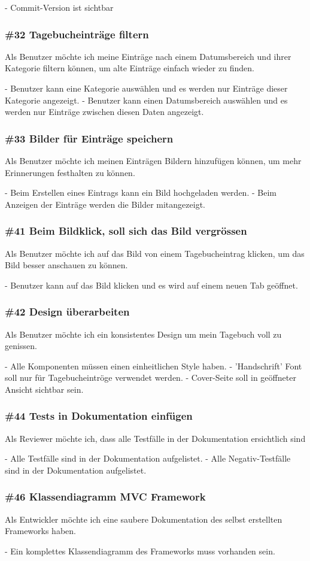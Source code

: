 \noindent
- Commit-Version ist sichtbar


\subsubsection*{\#32 Tagebucheinträge filtern}
Als Benutzer möchte ich meine Einträge nach einem Datumsbereich und ihrer Kategorie filtern können, um alte Einträge einfach wieder zu finden.

\noindent
 - Benutzer kann eine Kategorie auswählen und es werden nur Einträge dieser Kategorie angezeigt.
 - Benutzer kann einen Datumsbereich auswählen und es werden nur Einträge zwischen diesen Daten angezeigt.

 \subsubsection*{\#33 Bilder für Einträge speichern}
 Als Benutzer möchte ich meinen Einträgen Bildern hinzufügen können, um mehr Erinnerungen festhalten zu können.

 \noindent
 - Beim Erstellen eines Eintrags kann ein Bild hochgeladen werden.
 - Beim Anzeigen der Einträge werden die Bilder mitangezeigt.

 \subsubsection*{\#41 Beim Bildklick, soll sich das Bild vergrössen}
 Als Benutzer möchte ich auf das Bild von einem Tagebucheintrag klicken, um das Bild besser anschauen zu können.

 \noindent
 - Benutzer kann auf das Bild klicken und es wird auf einem neuen Tab geöffnet.

 \subsubsection*{\#42 Design überarbeiten}
 Als Benutzer möchte ich ein konsistentes Design um mein Tagebuch voll zu genissen.

 \noindent
 - Alle Komponenten müssen einen einheitlichen Style haben.
 - 'Handschrift' Font soll nur für Tagebucheintröge verwendet werden.
 - Cover-Seite soll in geöffneter Ansicht sichtbar sein.

 \subsubsection*{\#44 Tests in Dokumentation einfügen}
 Als Reviewer möchte ich, dass alle Testfälle in der Dokumentation ersichtlich sind

 \noindent
 - Alle Testfälle sind in der Dokumentation aufgelistet.
 - Alle Negativ-Testfälle sind in der Dokumentation aufgelistet.

 \subsubsection*{\#46 Klassendiagramm MVC Framework}
 Als Entwickler möchte ich eine saubere Dokumentation des selbst erstellten Frameworks haben.

 \noindent
 - Ein komplettes Klassendiagramm des Frameworks muss vorhanden sein.

 